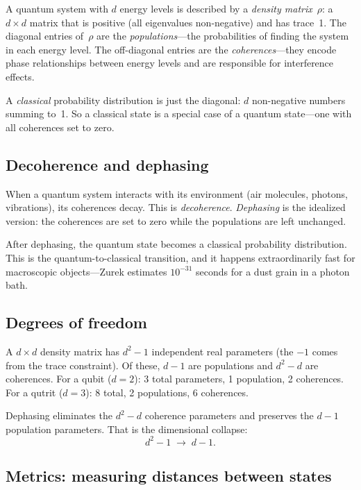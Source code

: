\documentclass[11pt,a4paper]{article}
\begin{document}
A quantum system with $d$ energy levels is described by a \emph{density matrix}~$\rho$: a $d \times d$ matrix that is positive (all eigenvalues non-negative) and has trace~1.  The diagonal entries of~$\rho$ are the \emph{populations}---the probabilities of finding the system in each energy level.  The off-diagonal entries are the \emph{coherences}---they encode phase relationships between energy levels and are responsible for interference effects.

A \emph{classical} probability distribution is just the diagonal: $d$ non-negative numbers summing to~1.  So a classical state is a special case of a quantum state---one with all coherences set to zero.

\subsection*{Decoherence and dephasing}

When a quantum system interacts with its environment (air molecules, photons, vibrations), its coherences decay.  This is \emph{decoherence}.  \emph{Dephasing} is the idealized version: the coherences are set to zero while the populations are left unchanged.

After dephasing, the quantum state becomes a classical probability distribution.  This is the quantum-to-classical transition, and it happens extraordinarily fast for macroscopic objects---Zurek estimates $10^{-31}$ seconds for a dust grain in a photon bath.

\subsection*{Degrees of freedom}

A $d \times d$ density matrix has $d^2 - 1$ independent real parameters (the $-1$ comes from the trace constraint).  Of these, $d - 1$ are populations and $d^2 - d$ are coherences.  For a qubit ($d = 2$): 3 total parameters, 1 population, 2 coherences.  For a qutrit ($d = 3$): 8 total, 2 populations, 6 coherences.

Dephasing eliminates the $d^2 - d$ coherence parameters and preserves the $d - 1$ population parameters.  That is the dimensional collapse:
\[
d^2 - 1 \;\longrightarrow\; d - 1.
\]

\subsection*{Metrics: measuring distances between states}
\end{document}
